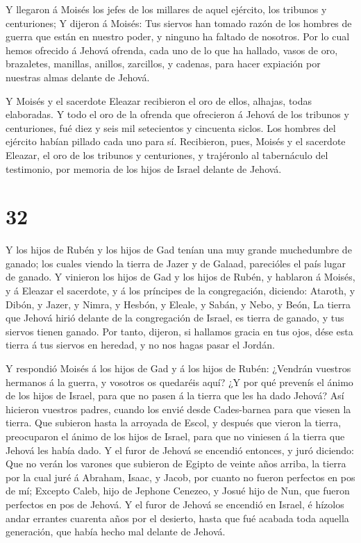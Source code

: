  Y llegaron á Moisés los jefes de los millares de aquel
ejército, los tribunos y centuriones;  Y dijeron á Moisés:
Tus siervos han tomado razón de los hombres de guerra que están en
nuestro poder, y ninguno ha faltado de nosotros.  Por lo
cual hemos ofrecido á Jehová ofrenda, cada uno de lo que ha hallado,
vasos de oro, brazaletes, manillas, anillos, zarcillos, y cadenas, para
hacer expiación por nuestras almas delante de Jehová.

 Y Moisés y el sacerdote Eleazar recibieron el oro de
ellos, alhajas, todas elaboradas.  Y todo el oro de la
ofrenda que ofrecieron á Jehová de los tribunos y centuriones, fué diez
y seis mil setecientos y cincuenta siclos.  Los hombres del
ejército habían pillado cada uno para sí.  Recibieron,
pues, Moisés y el sacerdote Eleazar, el oro de los tribunos y
centuriones, y trajéronlo al tabernáculo del testimonio, por memoria de
los hijos de Israel delante de Jehová.

\hypertarget{section-31}{%
\section{32}\label{section-31}}

 Y los hijos de Rubén y los hijos de Gad tenían una muy
grande muchedumbre de ganado; los cuales viendo la tierra de Jazer y de
Galaad, parecióles el país lugar de ganado.  Y vinieron los
hijos de Gad y los hijos de Rubén, y hablaron á Moisés, y á Eleazar el
sacerdote, y á los príncipes de la congregación, diciendo: 
Ataroth, y Dibón, y Jazer, y Nimra, y Hesbón, y Eleale, y Sabán, y Nebo,
y Beón,  La tierra que Jehová hirió delante de la
congregación de Israel, es tierra de ganado, y tus siervos tienen
ganado.  Por tanto, dijeron, si hallamos gracia en tus ojos,
dése esta tierra á tus siervos en heredad, y no nos hagas pasar el
Jordán.

 Y respondió Moisés á los hijos de Gad y á los hijos de
Rubén: ¿Vendrán vuestros hermanos á la guerra, y vosotros os quedaréis
aquí?  ¿Y por qué prevenís el ánimo de los hijos de Israel,
para que no pasen á la tierra que les ha dado Jehová?  Así
hicieron vuestros padres, cuando los envié desde Cades-barnea para que
viesen la tierra.  Que subieron hasta la arroyada de Escol,
y después que vieron la tierra, preocuparon el ánimo de los hijos de
Israel, para que no viniesen á la tierra que Jehová les había dado.
 Y el furor de Jehová se encendió entonces, y juró
diciendo:  Que no verán los varones que subieron de Egipto
de veinte años arriba, la tierra por la cual juré á Abraham, Isaac, y
Jacob, por cuanto no fueron perfectos en pos de mí; 
Excepto Caleb, hijo de Jephone Cenezeo, y Josué hijo de Nun, que fueron
perfectos en pos de Jehová.  Y el furor de Jehová se
encendió en Israel, é hízolos andar errantes cuarenta años por el
desierto, hasta que fué acabada toda aquella generación, que había hecho
mal delante de Jehová.

